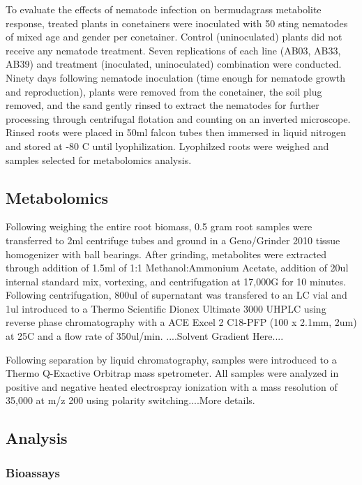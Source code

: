 \documentclass[9pt,lineno]{elife}
\begin{document}
To evaluate the effects of nematode infection on bermudagrass metabolite response, treated plants in conetainers were inoculated with 50 sting nematodes of mixed age and gender per conetainer.  Control (uninoculated) plants did not receive any nematode treatment. Seven replications of each line (AB03, AB33, AB39) and treatment (inoculated, uninoculated) combination were conducted.  Ninety days following nematode inoculation (time enough for nematode growth and reproduction), plants were removed from the conetainer, the soil plug removed, and the sand gently rinsed to extract the nematodes for further processing through centrifugal flotation and counting on an inverted microscope.  Rinsed roots were placed in 50ml falcon tubes then immersed in liquid nitrogen and stored at -80 C until lyophilization.  Lyophilzed roots were weighed and samples selected for metabolomics analysis. 

\subsection{Metabolomics}

Following weighing the entire root biomass, 0.5 gram root samples were transferred to 2ml centrifuge tubes and ground in a Geno/Grinder 2010 tissue homogenizer with ball bearings.  After grinding, metabolites were extracted through addition of 1.5ml of 1:1 Methanol:Ammonium Acetate, addition of 20ul internal standard mix, vortexing, and centrifugation at 17,000G for 10 minutes.  Following centrifugation, 800ul of supernatant was transfered to an LC vial and 1ul introduced to a Thermo Scientific Dionex Ultimate 3000 UHPLC using reverse phase chromatography with a ACE Excel 2 C18-PFP (100 x 2.1mm, 2um) at 25C and a flow rate of 350ul/min.  ....Solvent Gradient Here.... 

Following separation by liquid chromatography, samples were introduced to a Thermo Q-Exactive Orbitrap mass spetrometer.  All samples were analyzed in positive and negative heated electrospray ionization with a mass resolution of 35,000 at m/z 200 using polarity switching....More details.  


\subsection{Analysis}

\subsubsection{Bioassays}
\end{document}
